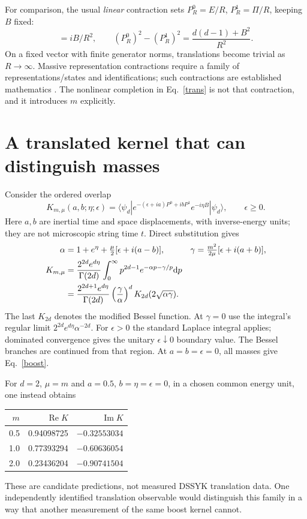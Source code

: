\documentclass[11pt,a4paper]{article}
\newcommand{\dd}{\mathrm d}
\begin{document}
For comparison, the usual \emph{linear} contraction sets
$P^0_R=E/R$, $P^1_R=\Pi/R$, keeping $B$ fixed:
\begin{equation}
 [P^0_R,P^1_R]=iB/R^2,\qquad
 (P^0_R)^2-(P^1_R)^2=\frac{d(d-1)+B^2}{R^2}.
\end{equation}
On a fixed vector with finite generator norms, translations become
trivial as $R\to\infty$. Massive representation contractions require
a family of representations/states and identifications; such contractions
are established mathematics \cite{contraction}. The nonlinear completion
in Eq.~\eqref{trans} is not that contraction, and it introduces $m$ explicitly.

\newpage
\section{A translated kernel that can distinguish masses}
Consider the ordered overlap
\begin{equation}
 K_{m,\mu}(a,b;\eta;\epsilon)=
 \langle\psi_d|e^{-(\epsilon+ia)P^0+ibP^1}e^{-i\eta B}|\psi_d\rangle,
 \qquad \epsilon\ge0.\label{spatial}
\end{equation}
Here $a,b$ are inertial time and space displacements, with inverse-energy
units; they are not microscopic string time $t$. Direct substitution gives
\begin{align}
 \alpha&=1+e^\eta+\tfrac\mu2[\epsilon+i(a-b)],&
 \gamma&=\tfrac{m^2}{2\mu}[\epsilon+i(a+b)],\notag\\
 K_{m,\mu}&=\frac{2^{2d}e^{d\eta}}{\Gamma(2d)}
 \int_0^\infty p^{2d-1}e^{-\alpha p-\gamma/p}\dd p\notag\\
 &=\frac{2^{2d+1}e^{d\eta}}{\Gamma(2d)}
 \left(\frac\gamma\alpha\right)^d K_{2d}(2\sqrt{\alpha\gamma}).\label{bessel}
\end{align}
The last $K_{2d}$ denotes the modified Bessel function. At $\gamma=0$
use the integral's regular limit
$2^{2d}e^{d\eta}\alpha^{-2d}$. For $\epsilon>0$ the standard Laplace
integral applies; dominated convergence gives the unitary
$\epsilon\downarrow0$ boundary value. The Bessel branches are continued
from that region. At $a=b=\epsilon=0$, all masses give Eq.~\eqref{boost}.

For $d=2$, $\mu=m$ and $a=0.5$, $b=\eta=\epsilon=0$, in a chosen
common energy unit, one instead obtains
\begin{center}
\begin{tabular}{rrr}
\toprule
$m$ & $\operatorname{Re} K$ & $\operatorname{Im} K$\\
\midrule
0.5 & 0.94098725 & $-0.32553034$\\
1.0 & 0.77393294 & $-0.60636054$\\
2.0 & 0.23436204 & $-0.90741504$\\
\bottomrule
\end{tabular}
\end{center}
These are candidate predictions, not measured DSSYK translation data.
One independently identified translation observable would distinguish
this family in a way that another measurement of the same boost kernel cannot.
\end{document}
